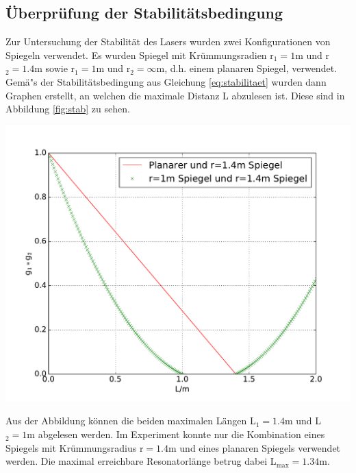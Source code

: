 \documentclass[]{scrartcl}
\begin{document}
\subsection{Überprüfung der Stabilitätsbedingung}
Zur Untersuchung der Stabilität des Lasers wurden zwei Konfigurationen von Spiegeln verwendet. Es wurden Spiegel mit Krümmungsradien r$_1=1\si{\meter}$ und r$_2=1.4\si{\meter}$ sowie r$_1=1\si{\meter}$ und r$_2=\infty\si{\meter}$, d.h. einem planaren Spiegel, verwendet. \\
Gemä"s der Stabilitätsbedingung aus Gleichung \ref{eq:stabilitaet} wurden dann Graphen erstellt, an welchen die maximale Distanz L abzulesen ist. Diese sind in Abbildung \ref{fig:stab} zu sehen. \\
\begin{center}
	\includegraphics[width=\textwidth]{images/vorbereitung.pdf}
	\label{fig:stab}
\end{center}
Aus der Abbildung können die beiden maximalen Längen L$_1=1.4\si{\meter}$ und L$_2=1\si{\metre}$ abgelesen werden. Im Experiment konnte nur die Kombination eines Spiegels mit Krümmungsradius r$=1.4\si{\metre}$ und eines planaren Spiegels verwendet werden. Die maximal erreichbare Resonatorlänge betrug dabei L$_{\text{max}}=1.34\si{\meter}$.
\end{document}
